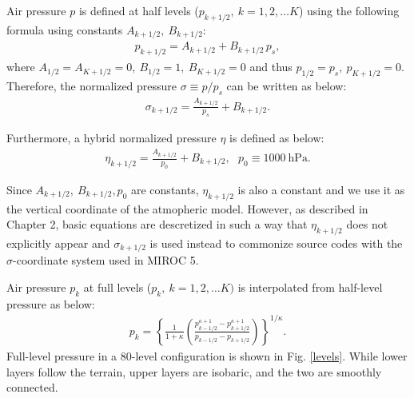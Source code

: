 Air pressure \(p\) is defined at half levels
(\(p_{k+1/2},\ k = 1, 2, \ldots K\)) using the following formula using
constants \(A_{k+1/2},\ B_{k+1/2}\):
\begin{eqnarray}
p_{k+1/2} = A_{k+1/2} +B_{k+1/2}\,p_s,
\end{eqnarray}
where \(A_{1/2}=A_{K+1/2}=0,\ B_{1/2}=1,\ B_{K+1/2}=0\) and thus
\(p_{1/2}=p_s,\ p_{K+1/2}=0\).
Therefore, the normalized pressure
\(\sigma\equiv p/p_s\) can be written as below:
\begin{eqnarray}
\sigma_{k+1/2} = \frac{A_{k+1/2}}{p_s} +B_{k+1/2}.
\end{eqnarray}

Furthermore, a hybrid normalized pressure \(\eta\) is defined as below:
\begin{eqnarray}
\eta_{k+1/2} = \frac{A_{k+1/2}}{p_0} +B_{k+1/2},\ \ \ p_0\equiv 1000\ \mathrm{hPa}.
\end{eqnarray}

Since \(A_{k+1/2},\ B_{k+1/2}, p_0\) are constants, \(\eta_{k+1/2}\) is
also a constant and we use it as the vertical coordinate of the
atmopheric model.
However, as described in Chapter 2, basic equations
are descretized in such a way that \(\eta_{k+1/2}\) does not explicitly
appear and \(\sigma_{k+1/2}\) is used instead to commonize source codes
with the \(\sigma\)-coordinate system used in MIROC 5.

Air pressure \(p_k\) at full levels (\(p_k,\ k=1,2,\ldots K)\) is
interpolated from half-level pressure as below:
\begin{eqnarray}
 p_k = \left\{ \frac{1}{1+\kappa}
                     \left( \frac{  p^{\kappa +1}_{k-1/2}
                                  - p^{\kappa +1}_{k+1/2}      }
                                  { p_{k-1/2} - p_{k+1/2} }
                     \right)
              \right\}^{1/\kappa}.
\end{eqnarray}
Full-level pressure in a 80-level configuration is shown in Fig.
\ref{levels}. While lower layers follow the terrain, upper layers are
isobaric, and the two are smoothly connected.

